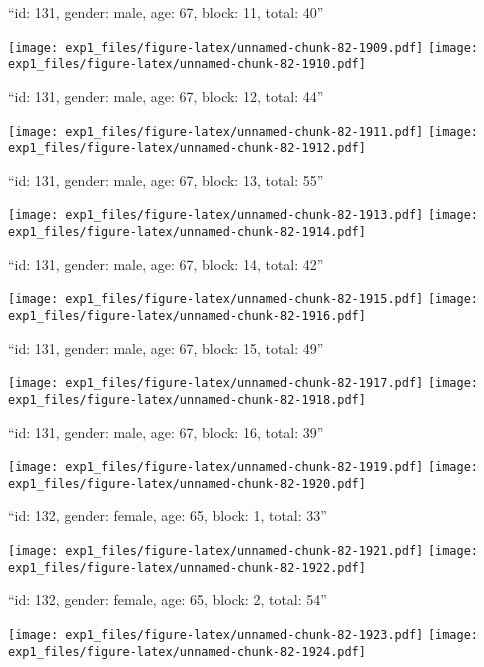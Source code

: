 \documentclass[11pt,,]{article}
\begin{document}
\newpage
[1] 

``id: 131, gender: male, age: 67, block: 11, total: 40''

\texttt{[image: exp1\_files/figure-latex/unnamed-chunk-82-1909.pdf]}
\texttt{[image: exp1\_files/figure-latex/unnamed-chunk-82-1910.pdf]}

\newpage
[1] 

``id: 131, gender: male, age: 67, block: 12, total: 44''

\texttt{[image: exp1\_files/figure-latex/unnamed-chunk-82-1911.pdf]}
\texttt{[image: exp1\_files/figure-latex/unnamed-chunk-82-1912.pdf]}

\newpage
[1] 

``id: 131, gender: male, age: 67, block: 13, total: 55''

\texttt{[image: exp1\_files/figure-latex/unnamed-chunk-82-1913.pdf]}
\texttt{[image: exp1\_files/figure-latex/unnamed-chunk-82-1914.pdf]}

\newpage
[1] 

``id: 131, gender: male, age: 67, block: 14, total: 42''

\texttt{[image: exp1\_files/figure-latex/unnamed-chunk-82-1915.pdf]}
\texttt{[image: exp1\_files/figure-latex/unnamed-chunk-82-1916.pdf]}

\newpage
[1] 

``id: 131, gender: male, age: 67, block: 15, total: 49''

\texttt{[image: exp1\_files/figure-latex/unnamed-chunk-82-1917.pdf]}
\texttt{[image: exp1\_files/figure-latex/unnamed-chunk-82-1918.pdf]}

\newpage
[1] 

``id: 131, gender: male, age: 67, block: 16, total: 39''

\texttt{[image: exp1\_files/figure-latex/unnamed-chunk-82-1919.pdf]}
\texttt{[image: exp1\_files/figure-latex/unnamed-chunk-82-1920.pdf]}

\newpage
[1] 

``id: 132, gender: female, age: 65, block: 1, total: 33''

\texttt{[image: exp1\_files/figure-latex/unnamed-chunk-82-1921.pdf]}
\texttt{[image: exp1\_files/figure-latex/unnamed-chunk-82-1922.pdf]}

\newpage
[1] 

``id: 132, gender: female, age: 65, block: 2, total: 54''

\texttt{[image: exp1\_files/figure-latex/unnamed-chunk-82-1923.pdf]}
\texttt{[image: exp1\_files/figure-latex/unnamed-chunk-82-1924.pdf]}
\end{document}
